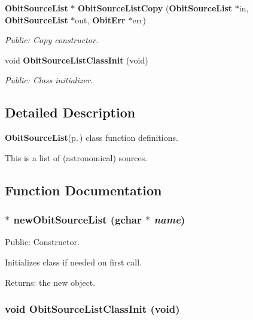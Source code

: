 \begin{CompactItemize}
{\bf Obit\-Source\-List} $\ast$ {\bf Obit\-Source\-List\-Copy} ({\bf Obit\-Source\-List} $\ast$in, {\bf Obit\-Source\-List} $\ast$out, {\bf Obit\-Err} $\ast$err)
\begin{CompactList}\small\item\em Public: Copy constructor. \item\end{CompactList}\item 
void {\bf Obit\-Source\-List\-Class\-Init} (void)
\begin{CompactList}\small\item\em Public: Class initializer. \item\end{CompactList}\end{CompactItemize}


\subsection{Detailed Description}
{\bf Obit\-Source\-List}{\rm (p.\,\pageref{structObitSourceList})} class function definitions. 

This is a list of (astronomical) sources.

\subsection{Function Documentation}
\subsubsection{$\ast$ new\-Obit\-Source\-List (gchar $\ast$ {\em name})}\label{ObitSourceList_8c_a6}


Public: Constructor. 

Initializes class if needed on first call. \begin{Desc}
\item[Returns:]the new object. \end{Desc}
\subsubsection{\setlength{\rightskip}{0pt plus 5cm}void Obit\-Source\-List\-Class\-Init (void)}\label{ObitSourceList_8c_a10}


